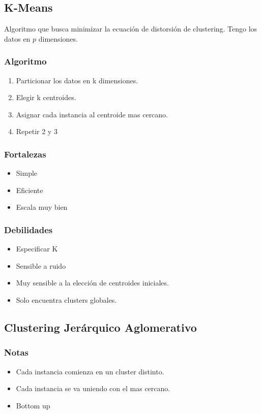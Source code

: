 \documentclass[titlepage,a4paper]{article}
\begin{document}
\subsection{K-Means}
Algoritmo que busca minimizar la ecuación de distorsión de clustering. Tengo los datos en $p$ dimensiones.

\subsubsection*{Algoritmo}
\begin{enumerate}
    \item Particionar los datos en k dimensiones. %
    \item Elegir k centroides.
    \item Asignar cada instancia al centroide mas cercano.
    \item Repetir 2 y 3
\end{enumerate}


\subsubsection*{Fortalezas}
\begin{itemize}
    \item Simple
    \item Eficiente
    \item Escala muy bien
\end{itemize}

\subsubsection*{Debilidades}
\begin{itemize}
    \item Especificar K
    \item Sensible a ruido
    \item Muy sensible a la elección de centroides iniciales.
    \item Solo encuentra clusters globales.
\end{itemize}


\subsection{Clustering Jerárquico Aglomerativo}
\subsubsection*{Notas}
\begin{itemize}
    \item Cada instancia comienza en un cluster distinto.
    \item Cada instancia se va uniendo con el mas cercano.
    \item Bottom up
\end{itemize}
\end{document}
